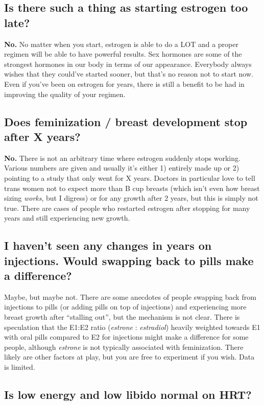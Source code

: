 \documentclass{article}
\begin{document}
{{\subsection{Is there such a thing as starting estrogen too late?}

\textbf{No.} No matter when you start, estrogen is able to do a LOT and a proper regimen will be able to have powerful results. Sex hormones are some of the strongest hormones in our body in terms of our appearance. Everybody always wishes that they could’ve started sooner, but that’s no reason not to start now. Even if you’ve been on estrogen for years, there is still a benefit to be had in improving the quality of your regimen.

\subsection{Does feminization / breast development stop after X years?}

\textbf{No.} There is not an arbitrary time where estrogen suddenly stops working. Various numbers are given and usually it’s either 1) entirely made up or 2) pointing to a study that only went for X years. Doctors in particular love to tell trans women not to expect more than B cup breasts (which isn’t even how breast sizing \textit{works}, but I digress) or for any growth after 2 years, but this is simply not true. There are cases of people who restarted estrogen after stopping for many years and still experiencing new growth.

\subsection{I haven’t seen any changes in years on injections. Would swapping back to pills make a difference?}

Maybe, but maybe not. There are some anecdotes of people swapping back from injections to pills (or adding pills on top of injections) and experiencing more breast growth after “stalling out”, but the mechanism is not clear. There is speculation that the E1:E2 ratio (\textit{estrone} : \textit{estradiol}) heavily weighted towards E1 with oral pills compared to E2 for injections might make a difference for some people, although \textit{estrone} is not typically associated with feminization. There likely are other factors at play, but you are free to experiment if you wish. Data is limited.

\subsection{Is low energy and low libido normal on HRT?}

}}
\end{document}

